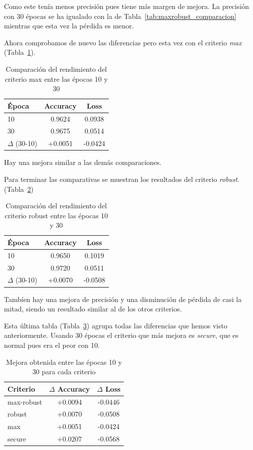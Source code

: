 \documentclass[conference,a4paper]{IEEEtran}
\begin{document}
Como este tenía menos precisión pues tiene más margen de mejora. La precisión con 30 épocas se ha igualado con la de Tabla~\ref{tab:maxrobust_comparacion} mientras que esta vez la pérdida es menor.

Ahora comprobamos de nuevo las diferencias pero esta vez con el criterio \textit{max} (Tabla~\ref{tab:max_10_30}).

\begin{table}[h]
\centering
\caption{Comparación del rendimiento del criterio max entre las épocas 10 y 30}
\label{tab:max_10_30}
\begin{tabular}{lcc}
\hline
\textbf{Época} & \textbf{Accuracy} & \textbf{Loss} \\
\hline
10 & 0.9624 & 0.0938 \\
30 & 0.9675 & 0.0514 \\
\hline
$\Delta$ (30-10) & +0.0051 & -0.0424 \\
\hline
\end{tabular}
\end{table}

Hay una mejora similar a las demás comparaciones.

Para terminar las comparativas se muestran los resultados del criterio \textit{robust}. (Tabla~\ref{tab:robust_10_30})

\begin{table}[h]
\centering
\caption{Comparación del rendimiento del criterio robust entre las épocas 10 y 30}
\label{tab:robust_10_30}
\begin{tabular}{lcc}
\hline
\textbf{Época} & \textbf{Accuracy} & \textbf{Loss} \\
\hline
10 & 0.9650 & 0.1019 \\
30 & 0.9720 & 0.0511 \\
\hline
$\Delta$ (30-10) & +0.0070 & -0.0508 \\
\hline
\end{tabular}
\end{table}


Tambíen hay una mejora de precisión y una disminución de pérdida de casi la mitad, siendo un resultado similar al de los otros criterios.

Esta última tabla (Tabla~\ref{tab:mejora_10_30}) agrupa todas las diferencias que hemos visto anteriormente. Usando 30 épocas el criterio que más mejora es \textit{secure}, que es normal pues era el peor con 10.

\begin{table}[h]
\centering
\caption{Mejora obtenida entre las épocas 10 y 30 para cada criterio}
\label{tab:mejora_10_30}
\begin{tabular}{lcc}
\hline
\textbf{Criterio} & $\Delta$ \textbf{Accuracy} & $\Delta$ \textbf{Loss} \\
\hline
max-robust & +0.0094 & -0.0446 \\
robust     & +0.0070 & -0.0508 \\
max        & +0.0051 & -0.0424 \\
secure     & +0.0207 & -0.0568 \\
\hline
\end{tabular}
\end{table}
\end{document}
